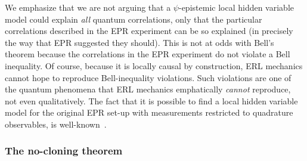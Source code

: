 \documentclass[pra,superscriptaddress,nofootinbib,12pt]{revtex4-2}
\begin{document}
We emphasize that we are not arguing that a $\psi$-epistemic local hidden variable model could explain \emph{all} quantum correlations, only that the particular correlations described in the EPR experiment can be so explained (in precisely the way that EPR suggested they should). This is not at odds with Bell's theorem because the correlations in the EPR experiment do not violate a Bell inequality.  Of course, because it is locally causal by construction, ERL mechanics cannot hope to reproduce Bell-inequality violations.  Such violations are one of the quantum phenomena that ERL mechanics emphatically \emph{cannot} reproduce, not even qualitatively.
The fact that it is possible to find a local hidden variable model for the original EPR set-up with measurements restricted to quadrature observables, is well-known~\cite{BellEPR,OuCVBell,Reid09}.


\subsubsection{The no-cloning theorem}

\end{document}
